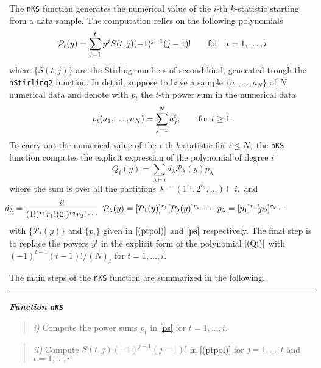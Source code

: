 The \texttt{nKS} function generates the numerical value of the \(i\)-th \(k\)-statistic starting from a data sample. The computation relies on the following polynomials
\begin{equation}
{\mathcal P}_t(y) = \sum_{j=1}^t y^j S(t,j) (-1)^{j-1} (j-1)! \qquad \hbox{for} \quad t=1, \ldots, i
\label{(ptpol)}
\end{equation}
where \(\{S(t,j)\}\) are the Stirling numbers of second kind, generated trough the \texttt{nStirling2} function. In detail, suppose to have a sample \(\{a_1, \ldots, a_N\}\) of \(N\) numerical data and denote with \(p_t\) the \(t\)-th power sum in the numerical data
\begin{equation}
p_t(a_1, \ldots, a_N)  = \sum_{j=1}^N a_j^t, \qquad \hbox{for} \,\,  t\geq 1.
\label{ps}
\end{equation}
To carry out the numerical value of the \(i\)-th \(k\)-statistic for \(i \leq N,\) the \texttt{nKS} function computes the explicit expression of the polynomial of degree \(i\)
\begin{equation}
Q_i(y) = \sum_{\lambda \vdash i} d_{\lambda} {\mathcal P}_{\lambda}(y) p_{\lambda}
\label{(Qi)}
\end{equation}
where the sum is over all the partitions \(\lambda=(1^{r_1},2^{r_2},\ldots) \vdash i,\) and
\begin{equation}
\hskip-1.5cm{\small d_{\lambda}=\frac{i!}{(1!)^{r_1} r_1! (2!)^{r_2} r_2! \cdots} \,\,\, {\mathcal P}_{\lambda}(y) =  [{\mathcal P}_{1}(y)]^{r_1} [{\mathcal P}_{2}(y)]^{r_2} \cdots \,\,\, {p}_{\lambda} =  [p_{1}]^{r_1} [p_{2}]^{r_2} \cdots} \!\!\!
\label{dlambda}
\end{equation}
with \(\{{\mathcal P}_{t}(y)\}\) and \(\{p_{t}\}\) given in \(\eqref{(ptpol)}\) and \(\eqref{ps}\) respectively. The final step is to replace the powers \(y^t\) in the explicit form of the polynomial \(\eqref{(Qi)}\) with \((-1)^{t-1} (t-1)!/(N)_t\) for \(t=1, \ldots,i.\)

\hskip-0.5cm The main steps of the \texttt{nKS} function are summarized in the following.
\noindent

\rule{13cm}{0.4pt}

\textbf{\emph{Function \texttt{nKS}}}

\begin{quote}
\emph{i)} Compute the power sums \(p_t\) in \eqref{ps} for \(t=1, \ldots,i.\)
\end{quote}

\begin{quote}
\emph{ii)} Compute \(S(t,j) (-1)^{j-1} (j-1)!\) in \eqref{(ptpol)} for \(j=1, \ldots,t\) and \(t=1,\ldots,i.\)
\end{quote}

